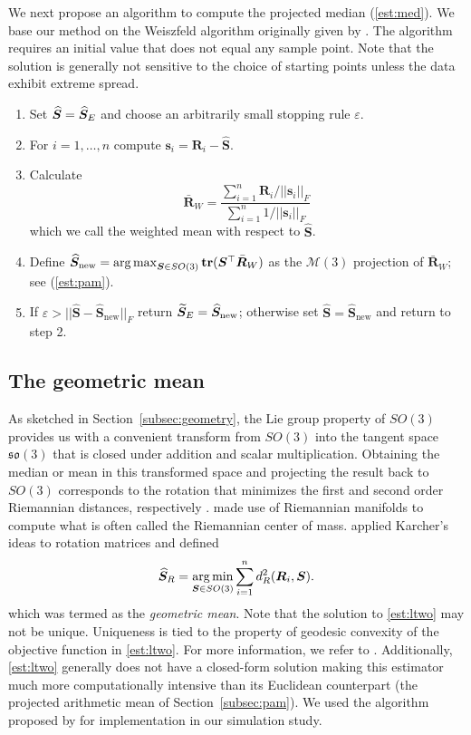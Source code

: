 We next propose an algorithm to compute the projected median (\ref{est:med}).  We base our method on the Weiszfeld algorithm originally given by \cite{weiszfeld37}.  The algorithm requires an initial value that does not equal any sample point.   Note that the solution is generally not sensitive to the choice of starting points unless the data exhibit extreme spread.
\begin{enumerate}
\item Set $\widehat{\bm S}={\widehat{\bm S}_E}$ and choose an arbitrarily small stopping rule $\varepsilon$.
\item For $i=1,\ldots,n$ compute $\bm s_i=\bm R_i-\widehat{\bm S}$.
\item Calculate
\[
\bar{\bm R}_W=\frac{\sum_{i=1}^n\bm R_i/||\bm s_i||_F}{\sum_{i=1}^n1/||\bm s_i||_F}
\]
which we call the weighted mean with respect to $\widehat{\bm S}$.  
\item Define $\widehat{\bm S}_{\text{new}} = \operatorname*{arg\,max}_{\bm{S}\in
SO(3)}{\mathbf{tr}}(\bm{S}^{\top}\bar{\bm{R}}_W)$ as the $\mathcal{M}(3)$ projection of $\bar{\bm R}_W$; see (\ref{est:pam}).
\item If $\varepsilon>||\widehat{\bm S}-\widehat{\bm S}_{\text{new}}||_F$ return ${\widetilde{\bm S}_E}=\widehat{\bm S}_{\text{new}}$; otherwise set $\widehat{\bm S}=\widehat{\bm S}_{\text{new}}$ and return to step 2.
\end{enumerate}

\subsection{The geometric mean}
\label{section:ltwo}
As sketched in Section~\ref{subsec:geometry}, the Lie group property of $SO(3)$ provides us with a convenient transform from $SO(3)$
into the tangent space $\mathfrak{so}(3)$ that is closed under
addition and scalar multiplication.  Obtaining the median or mean
in this transformed space and projecting the result back to $SO(3)$ corresponds to the rotation that minimizes the first and second order Riemannian
distances, respectively \citep{karcher77, moakher02, fletcher08, fletcher09}.  \citet{karcher77} made use of Riemannian manifolds to compute what is often called the Riemannian
center of mass.  \citet{moakher02} applied Karcher's ideas to
rotation matrices and defined
\begin{equation}\label{est:ltwo}
{\widehat{\bm S}_R}=\operatorname*{arg\,min}_{\bm{S}\in
SO(3)}\sum_{i=1}^n d^2_{R}(\bm{R}_i,\bm{S}).
\end{equation}
which was termed as the \textit{geometric mean}.  Note that the solution to  \eqref{est:ltwo} may not be
unique. Uniqueness is tied to the property of geodesic convexity of the objective function in \eqref{est:ltwo}. For more information, we refer to \citet{moakher02}.  Additionally, \eqref{est:ltwo} generally does not have a closed-form solution making this estimator much more computationally intensive than its Euclidean counterpart (the projected arithmetic mean of Section~\ref{subsec:pam}).  We used the algorithm proposed by \citet{manton04} for implementation in our simulation study.

